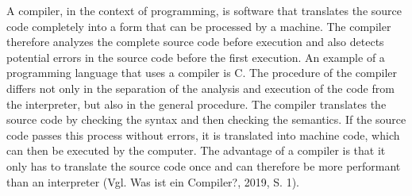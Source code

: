 A compiler, in the context of programming, is software that translates the source code completely into a form that can be processed by a machine. The compiler therefore analyzes the complete source code before execution and also detects potential errors in the source code before the first execution. An example of a programming language that uses a compiler is C.
The procedure of the compiler differs not only in the separation of the analysis and execution of the code from the interpreter, but also in the general procedure.
The compiler translates the source code by checking the syntax and then checking the semantics. If the source code passes this process without errors, it is translated into machine code, which can then be executed by the computer.
The advantage of a compiler is that it only has to translate the source code once and can therefore be more performant than an interpreter (Vgl. Was ist ein Compiler?, 2019, S. 1).
